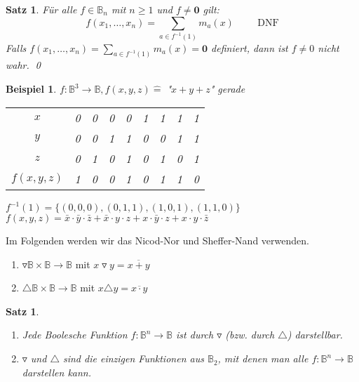 \documentclass[ngerman]{scrartcl}
\theoremstyle{custom}
\newtheorem{mex}[mdef]{Beispiel}
\newtheorem{ms}[mdef]{Satz}
\newcommand{\0}{\mathbf{0}}
\newcommand{\1}{\mathbf{L}}
\begin{document}
\begin{ms}
F\"ur alle $f \in \mathds{B}_n$ mit $n \geq 1$ und $f \not = \0$
gilt:
\begin{equation*}
f(x_1, \dots, x_n) = \sum_{a \in f^{-1}(1)} m_a(x) \hspace{1cm}
  \text{DNF}
\end{equation*}
Falls $f(x_1, \dots, x_n) = \sum_{a\in f^{-1}(1)} m_a(x) = \0$ definiert, dann ist $f \not = 0$ nicht wahr.
\qed
\end{ms}
\begin{mex}
$f: \mathds{B}^3 \rightarrow \mathds{B}, f(x,y,z)
\mathrel{\widehat{=}}$ "$x+y+z$" gerade

\begin{table}[h]
\begin{tabular}{c|cccccccc}
$x$ & 0 &0 &0 &0 &1 & 1 & 1 &1 \\
$y$ &0 & 0 & 1 & 1 & 0 & 0 &1 & 1\\
$z$ & 0 & 1 & 0 & 1 & 0 & 1 & 0 & 1 \\
\hline $f(x,y,z)$ & 1 & 0 & 0 & 1 & 0 & 1 & 1 & 0\\
\end{tabular}
\end{table}
$f^{-1}(1) = \{ (0,0,0), (0,1,1), (1,0,1), (1,1,0)\}$\\
$f(x,y,z) = \bar x \cdot \bar y \cdot \bar z + \bar x \cdot y \cdot z
+ x \cdot \bar y \cdot z + x \cdot y \cdot \bar z$
\end{mex}

Im Folgenden werden wir das Nicod-Nor und Sheffer-Nand verwenden.
\begin{enumerate}
\item $\triangledown \mathds{B} \times \mathds{B} \rightarrow
  \mathds{B}$ mit $x \triangledown y = \overline{x + y}$
\item $\triangle \mathds{B} \times \mathds{B} \rightarrow
  \mathds{B}$ mit $x \triangle y = \overline{x \cdot y}$
\end{enumerate}

\begin{ms} ~ \\
\begin{enumerate}
\item Jede Boolesche Funktion $f: \mathds{B}^n \rightarrow \mathds{B}$
  ist durch $\triangledown$ (bzw. durch $\triangle$) darstellbar.
\item $\triangledown$ und $\triangle$ sind die einzigen Funktionen aus
  $\mathds{B}_2$, mit denen man alle $f: \mathds{B}^n \rightarrow
  \mathds{B}$ darstellen kann.
\end{enumerate}
\end{ms}
\end{document}
